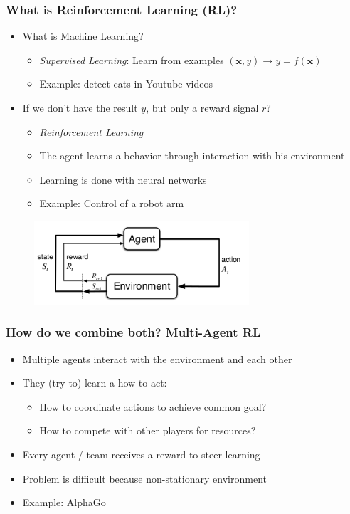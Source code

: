 \documentclass{beamer}
\begin{document}
\begin{frame}
\frametitle{What is Reinforcement Learning (RL)?}
\begin{itemize}
    \item What is Machine Learning?
        \begin{itemize}
            \item \emph{Supervised Learning}: Learn from examples $(\mathbf{x}, y) \rightarrow y = f(\mathbf{x})$
            \item Example: detect cats in Youtube videos
        \end{itemize}
    \item If we don't have the result $y$, but only a reward signal $r$?
    \begin{itemize}
        \item \emph{Reinforcement Learning}
        \item The agent learns a behavior through interaction with his environment
        \item Learning is done with neural networks
        \item Example: Control of a robot arm
    \end{itemize}
\end{itemize}
\begin{figure}[htp]
    \centering
    \includegraphics[width=8cm]{images/mdp.png}
    \label{fig:mdp}
\end{figure}
\end{frame}

\begin{frame}
\frametitle{How do we combine both? Multi-Agent RL}
\begin{itemize}
    \item Multiple agents interact with the environment and each other
    \item They (try to) learn a how to act:
        \begin{itemize}
            \item How to coordinate actions to achieve common goal?
            \item How to compete with other players for resources?
        \end{itemize}
    \item Every agent / team receives a reward to steer learning
    \item Problem is difficult because non-stationary environment
    \item Example: AlphaGo
\end{itemize}
\end{frame}
\end{document}
